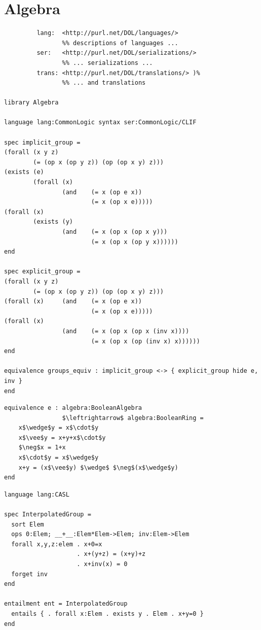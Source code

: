 \documentclass[10pt,fleqn,final]{scrreprt}
\newcommand{\sclause}[1]{\section{#1}}
\begin{document}
\sclause{Algebra}\label{ex:algebra}


\begin{lstlisting}[basicstyle=\ttfamily,language=dolText,alsolanguage=clif,escapechar=@,mathescape]
%prefix( :      <http://www.example.org/algebra#>
         lang:  <http://purl.net/DOL/languages/>
                %% descriptions of languages ...
         ser:   <http://purl.net/DOL/serializations/>
                %% ... serializations ...
         trans: <http://purl.net/DOL/translations/> )%
                %% ... and translations

library Algebra

language lang:CommonLogic syntax ser:CommonLogic/CLIF

spec implicit_group =
(forall (x y z)
        (= (op x (op y z)) (op (op x y) z)))
(exists (e)
        (forall (x)
                (and    (= x (op e x))
                        (= x (op x e)))))
(forall (x)
        (exists (y)
                (and    (= x (op x (op x y)))
                        (= x (op x (op y x))))))
end

spec explicit_group =
(forall (x y z)
        (= (op x (op y z)) (op (op x y) z)))
(forall (x)     (and    (= x (op e x))
                        (= x (op x e)))))
(forall (x)
                (and    (= x (op x (op x (inv x))))
                        (= x (op x (op (inv x) x))))))
end

equivalence groups_equiv : implicit_group <-> { explicit_group hide e, inv }
end
\end{lstlisting}

\begin{lstlisting}[basicstyle=\ttfamily,language=dolText,alsolanguage=clif,escapechar=@,mathescape]
equivalence e : algebra:BooleanAlgebra
                $\leftrightarrow$ algebra:BooleanRing =
    x$\wedge$y = x$\cdot$y
    x$\vee$y = x+y+x$\cdot$y
    $\neg$x = 1+x
    x$\cdot$y = x$\wedge$y
    x+y = (x$\vee$y) $\wedge$ $\neg$(x$\wedge$y)
end
\end{lstlisting}

\begin{lstlisting}[basicstyle=\ttfamily,language=dolText,alsolanguage=CASL,escapechar=@,mathescape]
language lang:CASL

spec InterpolatedGroup =
  sort Elem
  ops 0:Elem; __+__:Elem*Elem->Elem; inv:Elem->Elem
  forall x,y,z:elem . x+0=x
                    . x+(y+z) = (x+y)+z
                    . x+inv(x) = 0
  forget inv
end

entailment ent = InterpolatedGroup 
  entails { . forall x:Elem . exists y . Elem . x+y=0 }
end
\end{lstlisting}
\end{document}
